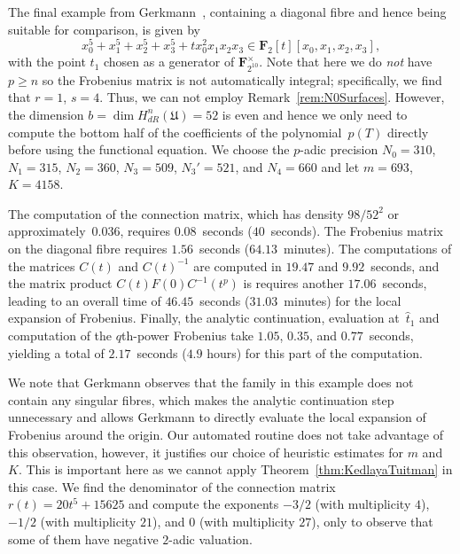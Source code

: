 The final example from Gerkmann~\citep[\S 7.6]{Gerkmann2007}, 
containing a diagonal fibre and hence being suitable for comparison, 
is given by 
\begin{equation}
x_0^5 + x_1^5 + x_2^5 + x_3^5 + t x_0^2 x_1 x_2 x_3 \in \mathbf{F}_2[t][x_0,x_1,x_2,x_3], 
\end{equation}
with the point $t_1$ chosen as a generator of $\mathbf{F}_{2^{10}}^{\times}$. 
Note that here we do \emph{not} have $p \geq n$ so the Frobenius matrix is not 
automatically integral;  specifically, we find that $r = 1$, $s = 4$.  Thus, 
we can not employ Remark~\ref{rem:N0Surfaces}.  However, the dimension 
$b = \dim H_{dR}^{n}(\mathfrak{U}) = 52$ is even and hence we only need to 
compute the bottom half of the coefficients of the polynomial~$p(T)$ directly 
before using the functional equation.  We choose the $p$-adic precision 
$N_0 = 310$, $N_1 = 315$, $N_2 = 360$, $N_3 = 509$, $N_3' = 521$, and 
$N_4 = 660$ and let $m = 693$, $K = 4158$.

The computation of the connection matrix, which has density $98 / 52^2$ 
or approximately~$0.036$, requires $0.08$~seconds ($40$~seconds).  
The Frobenius matrix on the diagonal fibre requires $1.56$~seconds 
($64.13$~minutes).  The computations of the matrices $C(t)$ and $C(t)^{-1}$ 
are computed in $19.47$ and $9.92$~seconds, and the matrix product 
$C(t) F(0) C^{-1}(t^p)$ is requires another $17.06$~seconds, leading 
to an overall time of $46.45$~seconds ($31.03$~minutes) for the local 
expansion of Frobenius.  Finally, the analytic continuation, evaluation 
at~$\hat{t}_1$ and computation of the $q$th-power Frobenius take $1.05$, 
$0.35$, and $0.77$~seconds, yielding a total of $2.17$~seconds ($4.9$ hours) 
for this part of the computation.

We note that Gerkmann observes that the family in this example does 
not contain any singular fibres, which makes the analytic continuation 
step unnecessary and allows Gerkmann to directly evaluate the local 
expansion of Frobenius around the origin.  Our automated routine 
does not take advantage of this observation, however, it justifies 
our choice of heuristic estimates for $m$ and $K$.  This is important 
here as we cannot apply Theorem~\ref{thm:KedlayaTuitman} in this case.  
We find the denominator of the connection matrix $r(t) = 20 t^5+15625$ 
and compute the exponents $-3/2$ (with multiplicity $4$), 
$-1/2$ (with multiplicity $21$), and $0$ (with multiplicity $27$), 
only to observe that some of them have negative $2$-adic valuation.

